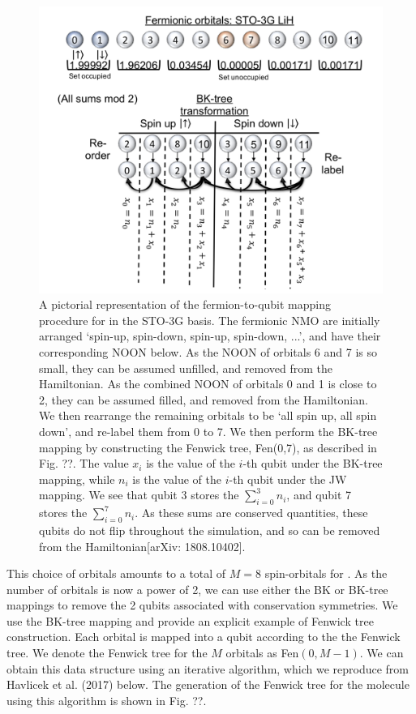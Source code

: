 \documentclass[11pt, oneside]{article}   	%
\begin{document}
\begin{figure}
\includegraphics[width=\linewidth]{figs/1808_10402_LiH.png}
\caption{A pictorial representation of the fermion-to-qubit mapping procedure for  in the STO-3G basis. The fermionic NMO are initially arranged `spin-up, spin-down, spin-up, spin-down, ...', and have their corresponding NOON below. As the NOON of orbitals 6 and 7 is so small, they can be assumed unfilled, and removed from the Hamiltonian. As the combined NOON of orbitals 0 and 1 is close to 2, they can be assumed filled, and removed from the Hamiltonian. We then rearrange the remaining orbitals to be `all spin up, all spin down', and re-label them from 0 to 7. We then perform the BK-tree mapping by constructing the Fenwick tree, Fen(0,7), as described in Fig. ??. The value $x_i$ is the value of the $i$-th qubit under the BK-tree mapping, while $n_i$ is the value of the $i$-th qubit under the JW mapping. We see that qubit 3 stores the $\sum^3_{i=0} n_i$, and qubit 7 stores the $\sum^7_{i=0} n_i$. As these sums are conserved quantities, these qubits do not flip throughout the simulation, and so can be removed from the Hamiltonian[arXiv: 1808.10402].}
\label{fig:LiH}
\end{figure}

This choice of orbitals amounts to a total of $M = 8$ spin-orbitals for .
As the number of orbitals is now a power of 2, we can use either the BK or BK-tree mappings to remove the 2 qubits associated with conservation symmetries. 
We use the BK-tree mapping and provide an explicit example of Fenwick tree construction. 
Each orbital is mapped into a qubit according to the the Fenwick tree.
We denote the Fenwick tree for the $M$ orbitals as Fen$(0, M-1)$. 
We can obtain this data structure using an iterative algorithm, which we reproduce from Havlicek et al. (2017) below. 
The generation of the Fenwick tree for the  molecule using this algorithm is shown in Fig. ??.
\end{document}

